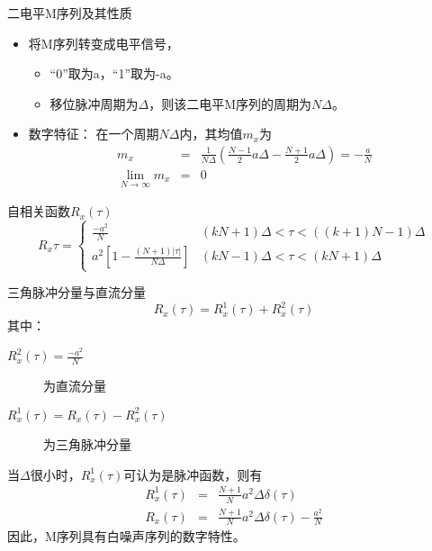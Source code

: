 \begin{frame}{二电平M序列及其性质}
\begin{itemize}
\item 将M序列转变成电平信号，
\begin{itemize}
\item “0”取为a，“1”取为-a。
\item 移位脉冲周期为$\Delta$，则该二电平M序列的周期为$N\Delta$。
\end{itemize}
\item 数字特征：
在一个周期$N\Delta$内，其均值$m_x$为 \\
\begin{eqnarray*}
m_x &=& \frac{1}{N\Delta}\left(\frac{N-1}{2}a\Delta-\frac{N+1}{2}a\Delta\right)=-\frac{a}{N} \\
\lim_{N\rightarrow \infty}m_x &=& 0
\end{eqnarray*}
\end{itemize}
\end{frame}


\begin{frame}{自相关函数$R_x(\tau)$}
$$
R_x{\tau}=\begin{cases}
\displaystyle \frac{-a^2}{N} & \scriptstyle (kN+1)\Delta<\tau<((k+1)N-1)\Delta  \\
\displaystyle a^2\left[ 1-\frac{(N+1)|\tau|}{N\Delta}\right] &\scriptstyle (kN-1)\Delta<\tau<(kN+1)\Delta
\end{cases}
$$
\end{frame}

\begin{frame}{三角脉冲分量与直流分量}
$$
R_x(\tau)=R^1_x(\tau)+R^2_x(\tau)
$$
其中：
\begin{description}
\item[$R_x^2(\tau)=\frac{-a^2}{N}$]为直流分量
\item[$R_x^1(\tau)=R_x(\tau)-R^2_x(\tau)$]为三角脉冲分量
\end{description}
\end{frame}

\begin{frame}
当$\Delta$很小时，$R_x^1(\tau)$可认为是脉冲函数，则有
\begin{eqnarray*}
R_x^1(\tau) &=& \frac{N+1}{N}a^2\Delta\delta(\tau) \\
R_x(\tau) &=& \frac{N+1}{N}a^2\Delta\delta(\tau)-\frac{a^2}{N}
\end{eqnarray*}
因此，M序列具有白噪声序列的数字特性。
\end{frame}

